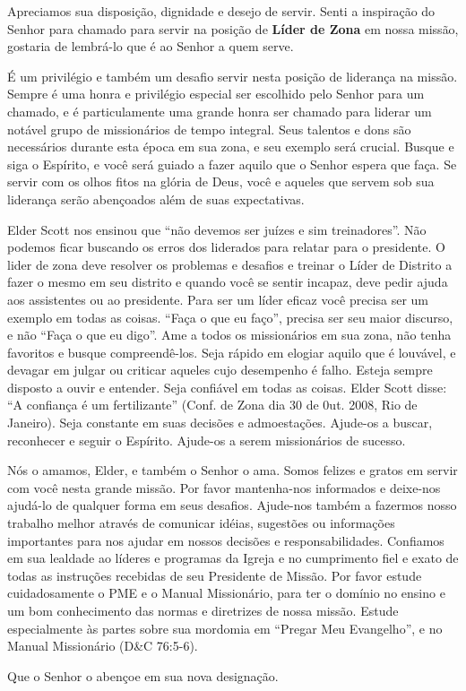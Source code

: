 Apreciamos sua disposi\c c\~ao, dignidade e desejo de servir. Senti a inspira\c c\~ao do Senhor para chamado para servir na posi\c c\~ao de \textbf{L\'ider de Zona} em nossa miss\~ao, gostaria de lembr\'a-lo que \'e ao Senhor a quem serve.

\'E um privil\'egio e tamb\'em um desafio servir nesta posi\c c\~ao de lideran\c ca na miss\~ao. Sempre \'e uma honra e privil\'egio especial ser escolhido pelo Senhor para um chamado, e \'e particulamente uma grande honra ser chamado para liderar um not\'avel grupo de mission\'arios de tempo integral. Seus talentos e dons s\~ao necess\'arios durante esta \'epoca em sua zona, e seu exemplo ser\'a crucial. Busque e siga o Esp\'irito, e voc\^e ser\'a guiado a fazer aquilo que o Senhor espera que fa\c ca. Se servir com os olhos fitos na gl\'oria de Deus, voc\^e e aqueles que servem sob sua lideran\c ca ser\~ao aben\c coados al\'em de suas expectativas.

Elder Scott nos ensinou que ``n\~ao devemos ser ju\'izes e sim treinadores''. N\~ao podemos ficar buscando os erros dos liderados para relatar para o presidente. O lider de zona deve resolver os problemas e desafios e treinar o L\'ider de Distrito a fazer o mesmo em seu distrito e quando voc\^e se sentir incapaz, deve pedir ajuda aos assistentes ou ao presidente. Para ser um l\'ider eficaz voc\^e precisa ser um exemplo em todas as coisas. ``Fa\c ca o que eu fa\c co'', precisa ser seu maior discurso, e n\~ao ``Fa\c ca o que eu digo''. Ame a todos os mission\'arios em sua zona, n\~ao tenha favoritos e busque compreend\^e-los. Seja r\'apido em elogiar aquilo que \'e louv\'avel, e devagar em julgar ou criticar aqueles cujo desempenho \'e falho. Esteja sempre disposto a ouvir e entender. Seja confi\'avel em todas as coisas. Elder Scott disse: ``A confian\c ca \'e um fertilizante'' (Conf. de Zona dia 30 de 0ut. 2008, Rio de Janeiro). Seja constante em suas decis\~oes e admoesta\c c\~oes. Ajude-os a buscar, reconhecer e seguir o Esp\'irito. Ajude-os a serem mission\'arios de sucesso.

N\'os o amamos, Elder, e tamb\'em o Senhor o ama. Somos felizes e gratos em servir com voc\^e nesta grande miss\~ao. Por favor mantenha-nos informados e deixe-nos ajud\'a-lo de qualquer forma em seus desafios. Ajude-nos tamb\'em a fazermos nosso trabalho melhor atrav\'es de comunicar id\'eias, sugest\~oes ou informa\c c\~oes importantes para nos ajudar em nossos decis\~oes e responsabilidades. Confiamos em sua lealdade ao l\'ideres e programas da Igreja e no cumprimento fiel e exato de todas as instru\c c\~oes recebidas de seu Presidente de Miss\~ao. Por favor estude cuidadosamente o PME e o Manual Mission\'ario, para ter o dom\'inio no ensino e um bom conhecimento das normas e diretrizes de nossa miss\~ao. Estude especialmente \`as partes sobre sua mordomia em ``Pregar Meu Evangelho'', e no Manual Mission\'ario (D\&C 76:5-6).

Que o Senhor o aben\c coe em sua nova designa\c c\~ao.
